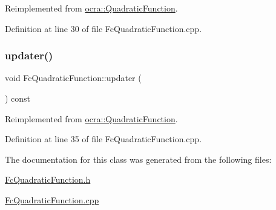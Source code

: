 Reimplemented from \hyperlink{classocra_1_1QuadraticFunction_ae68e94211c94e8c32da2220132baf248}{ocra\+::\+Quadratic\+Function}.



Definition at line 30 of file Fc\+Quadratic\+Function.\+cpp.

\hypertarget{classocra_1_1FcQuadraticFunction_aab41d4b011590ad42766e66df34305da}{}\label{classocra_1_1FcQuadraticFunction_aab41d4b011590ad42766e66df34305da} 
\subsubsection{\texorpdfstring{updater()}{updater()}}
{\footnotesize\ttfamily void Fc\+Quadratic\+Function\+::updater (\begin{DoxyParamCaption}{ }\end{DoxyParamCaption}) const\hspace{0.3cm}{\ttfamily [virtual]}}



Reimplemented from \hyperlink{classocra_1_1QuadraticFunction_aeaa560b1771f4024755753236fd69779}{ocra\+::\+Quadratic\+Function}.



Definition at line 35 of file Fc\+Quadratic\+Function.\+cpp.



The documentation for this class was generated from the following files\+:\begin{DoxyCompactItemize}
\item 
\hyperlink{FcQuadraticFunction_8h}{Fc\+Quadratic\+Function.\+h}\item 
\hyperlink{FcQuadraticFunction_8cpp}{Fc\+Quadratic\+Function.\+cpp}\end{DoxyCompactItemize}

